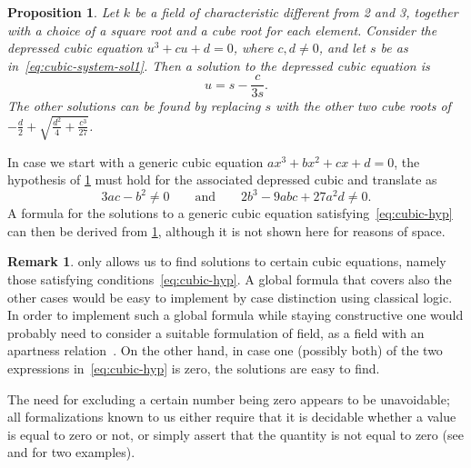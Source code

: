 \documentclass{article} %
\theoremstyle{plain}
\newtheorem{prop}[thm]{Proposition}
\theoremstyle{definition}
\newtheorem{rmk}[thm]{Remark}
\begin{document}
\begin{prop}\label{prop:depr-cubic-sol}
Let $k$ be a field of characteristic different from 2 and 3,
together with a choice of a square root and a cube root for each element.
Consider the depressed cubic equation $u^3 + cu + d = 0$,
where $c,d\neq0$, and let $s$ be as in~\eqref{eq:cubic-system-sol1}.
Then a solution to the depressed cubic equation is
\[
u = s - \frac{c}{3s}.
\]
The other solutions can be found by replacing $s$
with the other two cube roots of
$-\frac{d}{2} + \sqrt{\frac{d^2}{4} + \frac{c^3}{27}}$.
\end{prop}
%
In case we start with a generic cubic equation
$ax^3 + bx^2 + cx + d = 0$,
%
the hypothesis of \cref{prop:depr-cubic-sol} must hold for the
associated depressed cubic and translate as
\begin{equation}\label{eq:cubic-hyp}
3ac - b^2 \neq 0
\qquad\text{and}\qquad
2b^3 - 9abc + 27a^2d \neq 0.
\end{equation}
A formula for the solutions to a generic cubic equation
satisfying~\eqref{eq:cubic-hyp} can then be derived from
\cref{prop:depr-cubic-sol},
although it is not shown here for reasons of space.

\begin{rmk}
 only allows us to find solutions
to certain cubic equations, namely those satisfying conditions~\eqref{eq:cubic-hyp}.
A global formula that covers also the other cases
would be easy to implement by case distinction using classical logic.
In order to implement such a global formula while staying constructive
one would probably need to consider a suitable formulation of field,
as a field with an apartness relation~\cite{10.1305/ndjfl/1093635926}.
On the other hand, in case one (possibly both) of the two expressions
in~\eqref{eq:cubic-hyp} is zero, the solutions are easy to find.

The need for excluding a certain number being zero appears to be unavoidable; all formalizations known to us either require that it is decidable whether a value is equal to zero or not,
or simply assert that the quantity is not equal to zero (see \cite{coq_proof} and \cite{metamath_proof} for two examples).

\end{rmk}

\end{document}
